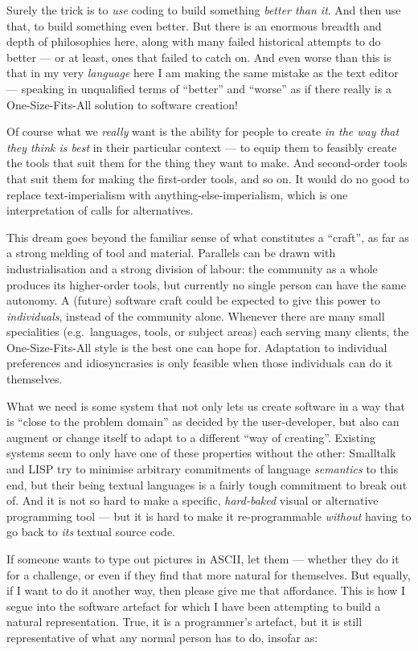 Surely the trick is to \emph{use} coding to build something \emph{better
than it}. And then use that, to build something even better. But there
is an enormous breadth and depth of philosophies here, along with many
failed historical attempts to do better --- or at least, ones that
failed to catch on. And even worse than this is that in my very
\emph{language} here I am making the same mistake as the text editor ---
speaking in unqualified terms of ``better'' and ``worse'' as if there
really is a One-Size-Fits-All solution to software creation!

Of course what we \emph{really} want is the ability for people to create
\emph{in the way that they think is best} in their particular context
--- to equip them to feasibly create the tools that suit them for the
thing they want to make. And second-order tools that suit them for
making the first-order tools, and so on. It would do no good to replace
text-imperialism with anything-else-imperialism, which is one
interpretation of calls for alternatives.

This dream goes beyond the familiar sense of what constitutes a
``craft'', as far as a strong melding of tool and material. Parallels
can be drawn with industrialisation and a strong division of labour: the
community as a whole produces its higher-order tools, but currently no
single person can have the same autonomy. A (future) software craft
could be expected to give this power to \emph{individuals}, instead of
the community alone. Whenever there are many small specialities
(e.g.~languages, tools, or subject areas) each serving many clients, the
One-Size-Fits-All style is the best one can hope for. Adaptation to
individual preferences and idiosyncrasies is only feasible when those
individuals can do it themselves.

What we need is some system that not only lets us create software in a
way that is ``close to the problem domain'' as decided by the
user-developer, but also can augment or change itself to adapt to a
different ``way of creating''. Existing systems seem to only have one of
these properties without the other: Smalltalk and LISP try to minimise
arbitrary commitments of language \emph{semantics} to this end, but
their being textual languages is a fairly tough commitment to break out
of. And it is not so hard to make a specific, \emph{hard-baked} visual
or alternative programming tool --- but it is hard to make it
re-programmable \emph{without} having to go back to \emph{its} textual
source code.

If someone wants to type out pictures in ASCII, let them --- whether
they do it for a challenge, or even if they find that more natural for
themselves. But equally, if I want to do it another way, then please
give me that affordance. This is how I segue into the software artefact
for which I have been attempting to build a natural representation.
True, it is a programmer's artefact, but it is still representative of
what any normal person has to do, insofar as:

